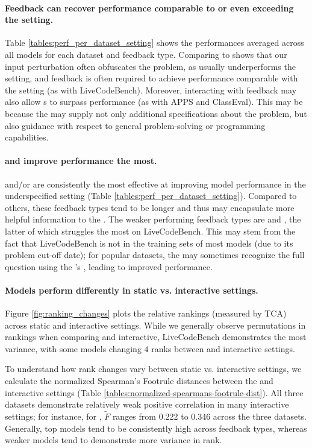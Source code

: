 \paragraph{Feedback can recover performance comparable to or even exceeding the \vanilla{} setting.}
Table \ref{tables:perf_per_dataset_setting} shows the performances averaged across all models for each dataset and feedback type.
Comparing \vanilla{} to \baseline{} shows that our input perturbation often obfuscates the problem, as \baseline{}  usually underperforms the \vanilla{} setting, and feedback is often required to achieve performance comparable with the \vanilla{} setting (as with LiveCodeBench).
Moreover, interacting with feedback may also allow \cm s to surpass \vanilla{} performance (as with APPS and ClassEval). 
This may be because the \user{} may supply not only additional specifications about the problem, but also guidance with respect to general problem-solving or programming capabilities.


\paragraph{\cf{} and \para{} improve performance the most.}
\cf{} and/or \para{} are consistently the most effective at improving model performance in the underspecified setting (Table \ref{tables:perf_per_dataset_setting}). 
Compared to others, these feedback types tend to be longer and thus may encapsulate more helpful information to the \cm.
The weaker performing feedback types are \sent{} and \ir, the latter of which struggles the most on LiveCodeBench.
This may stem from the fact that LiveCodeBench is not in the training sets of most models (due to its problem cut-off date); for popular datasets,  the \cm{} may sometimes recognize the full question using the \user 's \ir{}, leading to improved performance.






\paragraph{Models perform differently in static vs. interactive settings.} 
Figure \ref{fig:ranking_changes} plots the relative rankings (measured by TCA) across static and interactive settings. 
While we generally observe permutations in rankings when comparing \vanilla{} and interactive, LiveCodeBench demonstrates the most variance, with some models changing $4$ ranks between \vanilla{} and interactive settings.

To understand how rank changes vary between static vs. interactive settings, we calculate the normalized Spearman's Footrule distances between the \vanilla{} and interactive settings (Table \ref{tables:normalized-spearmans-footrule-dist}).
All three datasets demonstrate relatively weak positive correlation in many interactive settings; for instance, for \cf, $\tilde{F}$ ranges from 0.222 to 0.346 across the three datasets.
Generally, top models tend to be consistently high across feedback types, whereas weaker models tend to demonstrate more variance in rank. 


